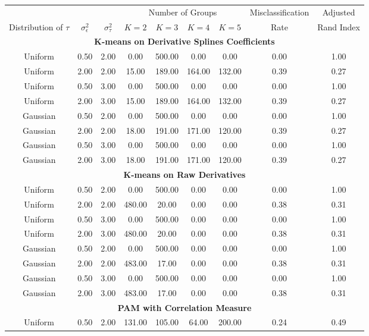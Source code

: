 \documentclass[12pt]{article}
\begin{document}
\begin{table}[ht]
\begin{center}
\begin{tabular}{ccc|cccccc}
  \hline &&&\multicolumn{4}{c}{Number of Groups}&Misclassification&Adjusted\\ Distribution of $\tau$&$\sigma_{\epsilon}^2$&$\sigma_{\tau}^2$&$K=2$&$K=3$&$K=4$&$K=5$&Rate&Rand Index\\ \hline\multicolumn{9}{c}{\textbf{K-means on Derivative Splines Coefficients}}\\ Uniform & 0.50 & 2.00 & 0.00 & 500.00 & 0.00 & 0.00 & 0.00 & 1.00 \\ 
  Uniform & 2.00 & 2.00 & 15.00 & 189.00 & 164.00 & 132.00 & 0.39 & 0.27 \\ 
  Uniform & 0.50 & 3.00 & 0.00 & 500.00 & 0.00 & 0.00 & 0.00 & 1.00 \\ 
  Uniform & 2.00 & 3.00 & 15.00 & 189.00 & 164.00 & 132.00 & 0.39 & 0.27 \\ 
  Gaussian & 0.50 & 2.00 & 0.00 & 500.00 & 0.00 & 0.00 & 0.00 & 1.00 \\ 
  Gaussian & 2.00 & 2.00 & 18.00 & 191.00 & 171.00 & 120.00 & 0.39 & 0.27 \\ 
  Gaussian & 0.50 & 3.00 & 0.00 & 500.00 & 0.00 & 0.00 & 0.00 & 1.00 \\ 
  Gaussian & 2.00 & 3.00 & 18.00 & 191.00 & 171.00 & 120.00 & 0.39 & 0.27 \\ 
   \multicolumn{9}{c}{\textbf{K-means on Raw Derivatives}}\\Uniform & 0.50 & 2.00 & 0.00 & 500.00 & 0.00 & 0.00 & 0.00 & 1.00 \\ 
  Uniform & 2.00 & 2.00 & 480.00 & 20.00 & 0.00 & 0.00 & 0.38 & 0.31 \\ 
  Uniform & 0.50 & 3.00 & 0.00 & 500.00 & 0.00 & 0.00 & 0.00 & 1.00 \\ 
  Uniform & 2.00 & 3.00 & 480.00 & 20.00 & 0.00 & 0.00 & 0.38 & 0.31 \\ 
  Gaussian & 0.50 & 2.00 & 0.00 & 500.00 & 0.00 & 0.00 & 0.00 & 1.00 \\ 
  Gaussian & 2.00 & 2.00 & 483.00 & 17.00 & 0.00 & 0.00 & 0.38 & 0.31 \\ 
  Gaussian & 0.50 & 3.00 & 0.00 & 500.00 & 0.00 & 0.00 & 0.00 & 1.00 \\ 
  Gaussian & 2.00 & 3.00 & 483.00 & 17.00 & 0.00 & 0.00 & 0.38 & 0.31 \\ 
   \multicolumn{9}{c}{\textbf{PAM with Correlation Measure}}\\Uniform & 0.50 & 2.00 & 131.00 & 105.00 & 64.00 & 200.00 & 0.24 & 0.49 \\ 

\end{tabular}
\end{center}
\end{table}
\end{document}
